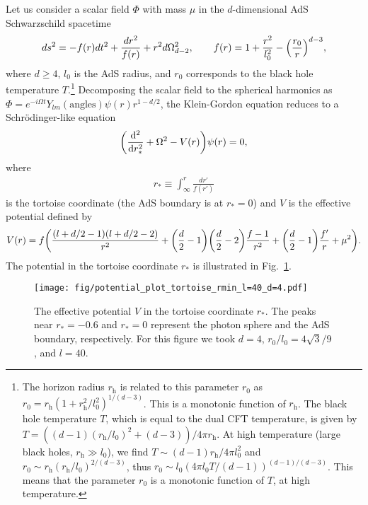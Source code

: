 \documentclass[a4paper,11pt]{article}
\begin{document}
Let us consider a scalar field $\Phi$ with mass $\mu$ in the $d$-dimensional AdS Schwarzschild spacetime 
\begin{align}
    ds^2=-f(r)dt^2+\frac{dr^2}{f(r)}+r^2d\Omega_{d-2}^2,\qquad f(r)=1+\frac{r^2}{l_0^2}-\qty(\frac{r_0}{r})^{d-3},
\end{align}
where $d\geq4$, $l_0$ is the AdS radius, and $r_0$ corresponds to the black hole temperature $T$.\footnote{
The horizon radius $r_\mathrm{h}$ is related to this parameter $r_0$ as $r_0 = r_\mathrm{h}(1 + r_\mathrm{h}^2/l_0^2)^{1/(d-3)}$.
This is a monotonic function of $r_\mathrm{h}$. The black hole temperature $T$, which is equal to the dual CFT temperature, is given by $T = ((d-1)(r_\mathrm{h}/l_0)^2 + (d-3))/4\pi r_\mathrm{h}$. At high temperature (large black holes, $r_\mathrm{h}\gg l_0$), we find $T\sim (d-1)r_\mathrm{h}/4\pi l_0^2$ and $r_0 \sim r_\mathrm{h}(r_\mathrm{h}/l_0)^{2/(d-3)}$, thus $r_0 \sim l_0 (4\pi l_0 T/(d-1))^{(d-1)/(d-3)}$. This means that the parameter $r_0$ is a monotonic function of $T$, at high temperature.
}
Decomposing the scalar field to the spherical harmonics as $\Phi=e^{-i\Omega t}Y_{lm}(\mathrm{angles})\psi(r)r^{1-d/2}$, the Klein-Gordon equation reduces to a Schr\"odinger-like equation \cite{Zerilli:1970wzz}
\begin{align}
    \qty(\dv[2]{r_*}+\Omega^2-V(r))\psi(r)=0,
    \label{Sch}
\end{align}
where 
\begin{align}
    r_* \equiv \int^r_\infty \frac{dr'}{f(r')}
\label{tort}
\end{align}
is the tortoise coordinate (the AdS boundary is at $r_*=0$) and $V$ is the effective potential defined by
\begin{align}
    V(r)=f\qty(\frac{(l+d/2-1)(l+d/2-2)}{r^2}+\qty(\frac{d}{2}-1)\qty(\frac{d}{2}-2)\frac{f-1}{r^2}+\qty(\frac{d}{2}-1)\frac{f'}{r}+\mu^2).
        \label{eq: Veff in SAdS}
\end{align}
The potential in the tortoise coordinate $r_*$ is illustrated in Fig.~\ref{fig: V in r*}.
\begin{figure}[t]
    \centering
    \texttt{[image: fig/potential\_plot\_tortoise\_rmin\_l=40\_d=4.pdf]}
    \caption{The effective potential $V$ in the tortoise coordinate $r_*$.
    The peaks near $r_*=-0.6$ and $r_*=0$ represent the photon sphere and the AdS boundary, respectively.
    For this figure we took $d=4$, $r_0/l_0=4\sqrt{3}/9$, and $l=40$. %
    }
    \label{fig: V in r*}
\end{figure}
\end{document}
